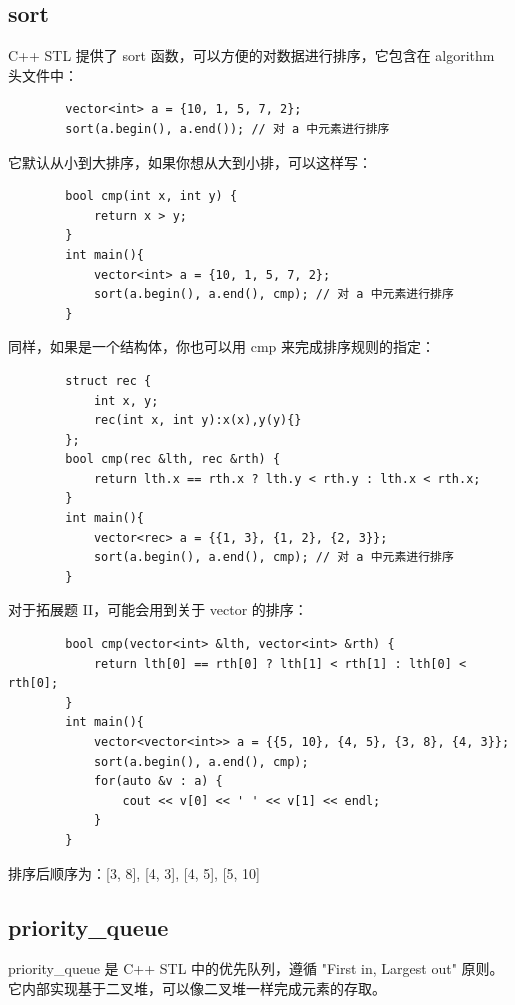 \documentclass[12pt,a4paper]{article}
\begin{document}
\subsection{sort}

C++ STL 提供了 sort 函数，可以方便的对数据进行排序，它包含在 algorithm 头文件中：

\begin{lstlisting}
        vector<int> a = {10, 1, 5, 7, 2};
        sort(a.begin(), a.end()); // 对 a 中元素进行排序
\end{lstlisting}

它默认从小到大排序，如果你想从大到小排，可以这样写：
\begin{lstlisting}
        bool cmp(int x, int y) {
            return x > y;
        }
        int main(){
            vector<int> a = {10, 1, 5, 7, 2};
            sort(a.begin(), a.end(), cmp); // 对 a 中元素进行排序
        }
\end{lstlisting}

同样，如果是一个结构体，你也可以用 cmp 来完成排序规则的指定：
\begin{lstlisting}
        struct rec {
            int x, y;
            rec(int x, int y):x(x),y(y){}
        };
        bool cmp(rec &lth, rec &rth) {
            return lth.x == rth.x ? lth.y < rth.y : lth.x < rth.x;
        }
        int main(){
            vector<rec> a = {{1, 3}, {1, 2}, {2, 3}};
            sort(a.begin(), a.end(), cmp); // 对 a 中元素进行排序
        }
\end{lstlisting}

对于拓展题 II，可能会用到关于 vector 的排序：

\begin{lstlisting}
        bool cmp(vector<int> &lth, vector<int> &rth) {
            return lth[0] == rth[0] ? lth[1] < rth[1] : lth[0] < rth[0];
        }
        int main(){
            vector<vector<int>> a = {{5, 10}, {4, 5}, {3, 8}, {4, 3}};
            sort(a.begin(), a.end(), cmp);
            for(auto &v : a) {
                cout << v[0] << ' ' << v[1] << endl;
            }
        }
\end{lstlisting}

排序后顺序为：[3, 8], [4, 3], [4, 5], [5, 10]

\subsection{priority\_queue}
priority\_queue 是 C++ STL 中的优先队列，遵循 "First in, Largest out" 原则。它内部实现基于二叉堆，可以像二叉堆一样完成元素的存取。
\end{document}
